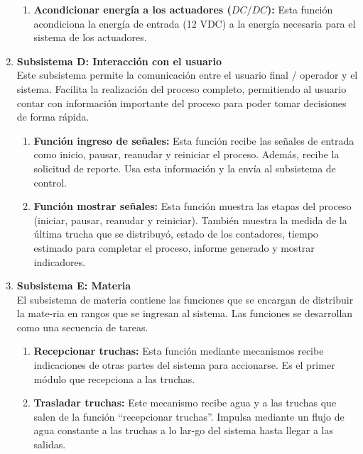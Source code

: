 \begin{enumerate}
\begin{enumerate}[label=\Alph*)]
		\item	\textbf{Acondicionar energía a los actuadores ($ DC/DC $):} Esta función acondiciona la energía de entrada (12 VDC) a la energía necesaria para el sistema de los actuadores.
		
	\end{enumerate}
	
	\item \textbf{Subsistema D: Interacción con el usuario}\\ Este subsistema permite la comunicación entre el usuario final / operador y el sistema. Facilita la realización del proceso completo, permitiendo al usuario contar con información importante del proceso para poder tomar decisiones de forma rápida.
	
	\begin{enumerate}[label=\Alph*)] %
		\item	\textbf{Función ingreso de señales:}		Esta función recibe las señales de entrada como inicio, pausar, reanudar y reiniciar el proceso. Además, recibe la solicitud de reporte. Usa esta información y la envía al subsistema de control.
		
		\item	\textbf{Función mostrar señales:}		Esta función muestra las etapas del proceso (iniciar, pausar, reanudar y reiniciar). También muestra la medida de la última trucha que se distribuyó, estado de los contadores, tiempo estimado para completar el proceso, informe generado y mostrar indicadores.
		
	\end{enumerate}

	\item \textbf{Subsistema E: Materia}\\ El subsistema de materia contiene las funciones que se encargan de distribuir la mate-ria en rangos que se ingresan al sistema. Las funciones se desarrollan como una secuencia de tareas.

	\begin{enumerate}[label=\Alph*)] %
		\item	\textbf{Recepcionar truchas:}
		Esta función mediante mecanismos recibe indicaciones de otras partes del sistema para accionarse. Es el primer módulo que recepciona a las truchas. 
		
		\item	\textbf{Trasladar truchas:}
		Este mecanismo recibe agua y a las truchas que salen de la función “recepcionar truchas”. Impulsa mediante un flujo de agua constante a las truchas a lo lar-go del sistema hasta llegar a las salidas.
		

\end{enumerate}
\end{enumerate}
